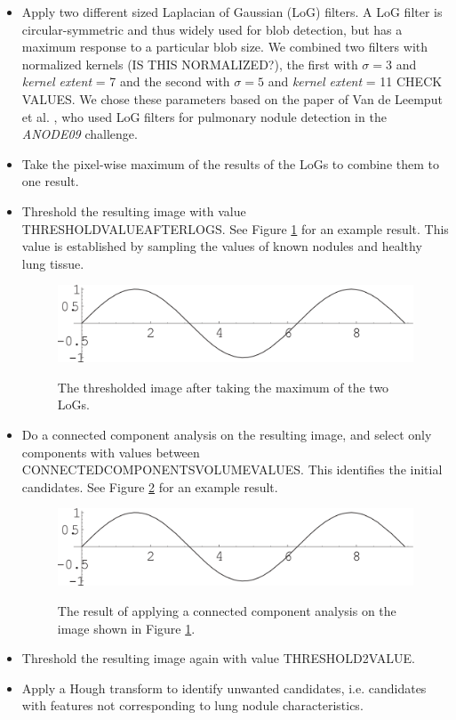 \documentclass{article}
\begin{document}
\begin{itemize}
\item Apply two different sized Laplacian of Gaussian (LoG) filters. A LoG filter is circular-symmetric and thus widely used for blob detection, but has a maximum response to a particular blob size. We combined two filters with normalized kernels (IS THIS NORMALIZED?), the first with $\sigma = 3$ and \emph{kernel extent} = 7 and the second with $\sigma = 5$ and \emph{kernel extent} = 11 CHECK VALUES. We chose these parameters based on the paper of Van de Leemput et al. \cite{leemput}, who used LoG filters for pulmonary nodule detection in the \emph{ANODE09} challenge.
\item Take the pixel-wise maximum of the results of the LoGs to combine them to one result.
\item Threshold the resulting image with value THRESHOLDVALUEAFTERLOGS. See Figure \ref{figure:LoGresult} for an example result. This value is established by sampling the values of known nodules and healthy lung tissue.
	\begin{figure}[h]
	\centering
	{\includegraphics[width=0.7\linewidth]{./figure.png}}
	\caption{The thresholded image after taking the maximum of the two LoGs. \label{figure:LoGresult}}
	\end{figure}
\item Do a connected component analysis on the resulting image, and select only components with values between CONNECTEDCOMPONENTSVOLUMEVALUES. This identifies the initial candidates. See Figure \ref{figure:conncomp} for an example result.
	\begin{figure}[h]
	\centering
	{\includegraphics[width=0.7\linewidth]{./figure.png}}
	\caption{The result of applying a connected component analysis on the image shown in Figure \ref{figure:LoGresult}. \label{figure:conncomp}}
	\end{figure}
\item Threshold the resulting image again with value THRESHOLD2VALUE.
\item Apply a Hough transform to identify unwanted candidates, i.e. candidates with features not corresponding to lung nodule characteristics.

\end{itemize}
\end{document}

